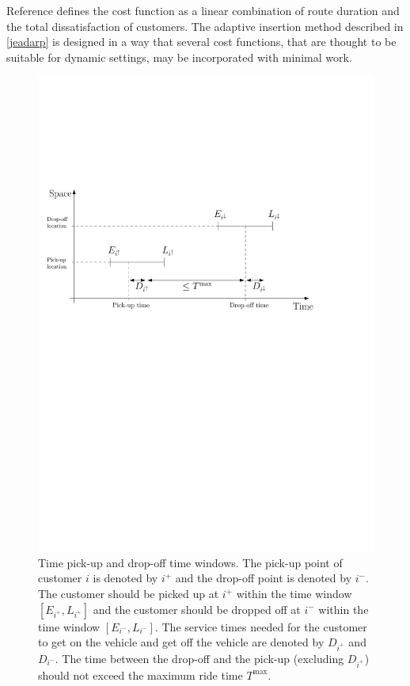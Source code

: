 \documentclass[dissertation,draft*]{aaltoseries}
\begin{document}
Reference \cite{psaraftis01} defines the cost function as a linear combination of route duration and the 
total dissatisfaction of customers. The adaptive insertion method described in \ref{jeadarp} is designed in a way 
that several cost functions, that are thought to be suitable for dynamic settings, may be incorporated with minimal work.

\begin{figure}[ht]
\begin{center}
\includegraphics[width=0.8 \columnwidth]{timeline01}
\caption{Time pick-up and drop-off time windows. The pick-up point of
customer $i$ is denoted by $i^{+}$ and the drop-off point is denoted by $i^{-}$.
The customer should be picked up at $i^{+}$ within the time window $[E_{i^+},L_{i^+}]$
and the customer should be dropped off at $i^{-}$ within the time window $[E_{i^{-}},L_{i^{-}}]$.
The service times needed for the customer to get on the vehicle
and get off the vehicle are denoted by $D_{i^+}$ and $D_{i^-}$. The time between
the drop-off and the pick-up (excluding $D_{i^+}$) should not exceed the maximum ride time $T^{\max}$.
}
\label{timeline01}
\end{center}
\end{figure}
\end{document}
